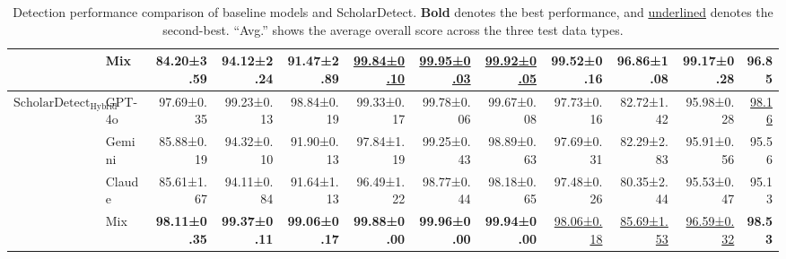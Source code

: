 \begin{table*}[t]
{\begin{tabular}{@{}l|p{1.3cm}|rrr|rrr|rrr|r@{}}
                                                                 & Mix                                & 84.20\small ±3.59          & 94.12\small ±2.24          & 91.47\small ±2.89          & \underline{99.84\small ±0.10}          & \underline{99.95\small ±0.03}          & \underline{99.92\small ±0.05}          & \textbf{99.52\small ±0.16} & \textbf{96.86\small ±1.08} & \textbf{99.17\small ±0.28} & 96.85                                                 \\ \midrule
\multirow{4}{*}{\textbf{$\text{ScholarDetect}_{\text{Hybrid}}$}} & GPT-4o                             & 97.69\small ±0.35          & 99.23\small ±0.13          & 98.84\small ±0.19          & 99.33\small ±0.17          & 99.78\small ±0.06          & 99.67\small ±0.08          & 97.73\small ±0.16          & 82.72\small ±1.42          & 95.98\small ±0.28          & \underline{98.16}                                                 \\
                                                                 & Gemini                             & 85.88\small ±0.19          & 94.32\small ±0.10          & 91.90\small ±0.13          & 97.84\small ±1.19          & 99.25\small ±0.43          & 98.89\small ±0.63          & 97.69\small ±0.31          & 82.29\small ±2.83          & 95.91\small ±0.56          & 95.56                                                 \\
                                                                 & Claude                             & 85.61\small ±1.67          & 94.11\small ±0.84          & 91.64\small ±1.13          & 96.49\small ±1.22          & 98.77\small ±0.44          & 98.18\small ±0.65          & 97.48\small ±0.26          & 80.35\small ±2.44          & 95.53\small ±0.47          & 95.13                                                 \\
                                                                 & Mix                                & \textbf{98.11\small ±0.35} & \textbf{99.37\small ±0.11} & \textbf{99.06\small ±0.17} & \textbf{99.88\small ±0.00} & \textbf{99.96\small ±0.00} & \textbf{99.94\small ±0.00} & \underline{98.06\small ±0.18}          & \underline{85.69\small ±1.53}          & \underline{96.59\small ±0.32}          & \textbf{98.53}                                        \\ \bottomrule
\end{tabular}}
\caption{Detection performance comparison of baseline models and ScholarDetect. \textbf{Bold} denotes the best performance, and \underline{underlined} denotes the second-best. ``Avg.'' shows the average overall score across the three test data types.}
\label{tab:fine-detection}
\end{table*}



